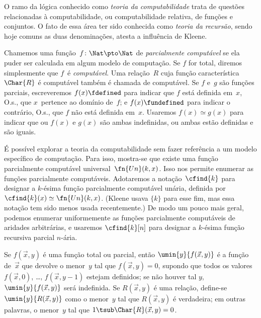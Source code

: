 \documentclass[../../../include/open-logic-section]{subfiles}
\begin{document}

O ramo da lógica conhecido como \emph{teoria da computabilidade} trata
de questões relacionadas à computabilidade, ou computabilidade relativa,
de funções e conjuntos. O fato de essa área ter sido conhecida como
\emph{teoria da recursão}, sendo hoje comuns as duas denominações,
atesta a influência de Kleene.

Chamemos uma função~$f\colon \Nat \pto \Nat$ de \emph{parcialmente
  computável} se ela puder ser calculada em algum modelo de computação.
Se $f$ for total, diremos simplesmente que $f$~é \emph{computável}.
Uma relação~$R$ cuja função característica~$\Char{R}$ é computável
também é chamada de computável. Se $f$ e~$g$ são funções parciais,
escreveremos $f(x) \fdefined$ para indicar que $f$ está definida
em~$x$, O.s.\@, que $x$~pertence ao domínio de~$f$; e
$f(x) \fundefined$ para indicar o contrário, O.s.\@, que $f$ não está
definida em~$x$. Usaremos $f(x) \simeq g(x)$ para indicar que ou
$f(x)$ e $g(x)$ são ambas indefinidas, ou ambas estão definidas e são
iguais.

É possível explorar a teoria da computabilidade sem fazer referência a
um modelo específico de computação. Para isso, mostra-se que existe uma
função parcialmente computável universal~$\fn{Un}(k, x)$. Isso nos
permite enumerar as funções parcialmente computáveis. Adotaremos a
notação~$\cfind{k}$ para designar a $k$-ésima função parcialmente
computável unária, definida por
$\cfind{k}(x) \simeq \fn{Un}(k, x)$. (Kleene usava $\{ k \}$ para
esse fim, mas essa notação tem sido menos usada recentemente.) De modo
um pouco mais geral, podemos enumerar uniformemente as funções
parcialmente computáveis de aridades arbitrárias, e usaremos
$\cfind{k}[n]$ para designar a $k$-ésima função recursiva parcial
$n$-ária.

Se $f(\vec x, y)$ é uma função total ou parcial, então $\umin{y}{f
(\vec x, y)}$ é a função de~$\vec x$ que devolve o menor~$y$ tal que
$f(\vec x, y) = 0$, supondo que todos os valores $f(\vec x, 0)$,
\dots, $f(\vec x, y-1)$ estejam definidos; se não houver tal $y$,
$\umin{y}{f (\vec x, y)}$ será indefinida. Se $R(\vec x, y)$ é uma
relação, define-se $\umin{y}{R(\vec x, y)}$ como o menor~$y$ tal que
$R(\vec x, y)$ é verdadeira; em outras palavras, o menor~$y$ tal que
$1 \tsub \Char{R}(\vec x, y) = 0$.
\end{document}
